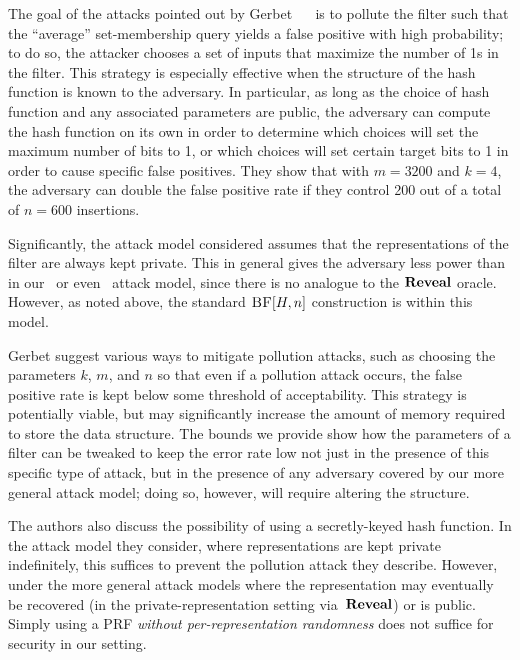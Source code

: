 %
%
The goal of the attacks pointed out by Gerbet \etal~~\cite{gerbet2015power} is
to pollute the filter such that the ``average'' set-membership query yields a
false positive with high probability; to do so, the attacker chooses a set of
inputs that maximize the number of 1s in the filter. This strategy is especially
effective when the structure of the hash function is known to the adversary. In
particular, as long as the choice of hash function and any associated parameters
are public, the adversary can compute the hash function on its own in order to
determine which choices will set the maximum number of bits to 1, or which
choices will set certain target bits to 1 in order to cause specific false
positives. They show that with $m = 3200$ and $k = 4$, the adversary can double
the false positive rate if they control 200 out of a total of $n = 600$
insertions.
%

Significantly, the attack model considered assumes that the representations of
the filter are always kept private. This in general gives the adversary less
power than in our \errep\ or even \erreps\ attack model, since there is no
analogue to the $\mathbf{Reveal}$ oracle. However, as noted above, the standard $\textnormal{\textsc{BF}}[H,n]$
construction is within this model.

Gerbet \etal suggest various ways to mitigate pollution attacks, such as choosing
the parameters $k$, $m$, and $n$ so that even if a pollution attack
occurs, the false positive rate is kept below some threshold of acceptability.
This strategy is  potentially viable, but may significantly increase the amount
of memory required to store the data structure.  The bounds we provide show how
the parameters of a filter can be tweaked to keep the error rate low not just in
the presence of this specific type of attack, but in the presence of any
adversary covered by our more general attack model; doing so, however, will
require altering the structure.

The authors also discuss the possibility of using a secretly-keyed
hash function. In the attack model they consider, where representations are kept
private indefinitely, this suffices to prevent the pollution attack they
describe. However, under the more general attack models where the representation
may eventually be recovered (in the private-representation setting via~$\mathbf{Reveal}$)
or is public.  Simply using a PRF \emph{without per-representation randomness}
does not suffice for security in our setting.

